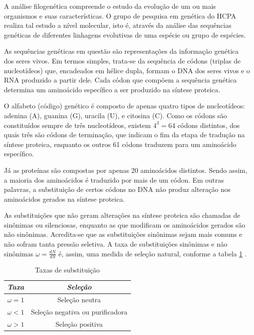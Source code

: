 \documentclass[cic,tc]{iiufrgs}
\begin{document}
A análise filogenética compreende o estudo da evolução de um ou mais organismos
e suas características. O grupo de pesquisa em genética do HCPA realiza tal
estudo a nível molecular, isto é, através da análise das sequências genéticas
de diferentes linhagens evolutivas de uma espécie ou grupo de espécies.

As sequências genéticas em questão são representações da informação genética
dos seres vivos. Em termos simples, trata-se da sequência de códons (triplas de
nucleotídeos) que, encadeados em hélice dupla, formam o DNA dos seres vivos e o
RNA produzido a partir dele. Cada códon que compõem a sequência genética
determina um aminoácido específico a ser produzido na síntese proteica.

O alfabeto (código) genético é composto de apenas quatro tipos de nucleotídeos:
adenina (A), guanina (G), uracila (U), e citosina (C). Como os códons são
constituídos sempre de três nucleotídeos, existem $4^3 = 64$ códons distintos,
dos quais três são códons de terminação, que indicam o fim da etapa de tradução
na síntese proteica, enquanto os outros 61 códons traduzem para um aminoácido
específico.

Já as proteínas são compostas por apenas 20 aminoácidos distintos. Sendo assim,
a maioria dos aminoácidos é traduzido por mais de um códon. Em outras palavras,
a substituição de certos códons no DNA não produz alteração nos aminoácidos
gerados na síntese proteica.

As substituições que não geram alterações na síntese proteica são chamadas de
sinônimas ou silenciosas, enquanto as que modificam os aminoácidos gerados são
não sinônimas. Acredita-se que as substituições sinônimas sejam mais comuns e
não sofram tanta pressão seletiva. A taxa de substituições sinônimas e não
sinônimas $\omega = \frac{dN}{dS}$ é, assim, uma medida de seleção natural,
conforme a tabela \ref{tbl:ex1} \cite{yang2002codon}.

\begin{table}[h]
    \caption{Taxas de substituição}
    \centering
        \begin{tabular}{c|c}
          \hline
          \textit{Taxa}  &   \textit{Seleção} \\
          \hline
          \hline
          $\omega = 1$ & Seleção neutra \\
          $\omega < 1$ & Seleção negativa ou purificadora \\
          $\omega > 1$ & Seleção positiva \\
          \hline
        \end{tabular}
    \label{tbl:ex1}
\end{table}
\end{document}
